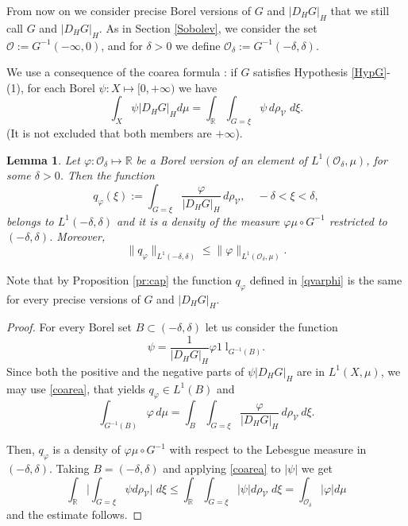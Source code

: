 \documentclass[reqno,twoside,12pt]{amsart}
\newtheorem{Lemma}[Theorem]{Lemma}
\begin{document}
From now on we consider  precise Borel versions of $G$ and $|D_HG|_H$ that we still call $G$ and $|D_HG|_H$. As in  Section \ref{Sobolev}, we consider the set ${\mathcal O}:= G^{-1}(-\infty, 0)$, and for $\delta >0$ we define
${\mathcal O}_{\delta} := G^{-1}(-\delta, \delta)$.   

We use a consequence of the coarea formula \cite[Thm. 5.7]{Feyel}: if $G$ satisfies Hypothesis \ref{HypG}-(1), for each Borel $\psi:X\mapsto [0, +\infty)$ we have
\begin{equation}
\label{coarea}
\int_X \psi |D_HG |_Hd\mu = \int_{\mathbb R} \int_{G =\xi} \psi \,d\rho_{{\mathcal V}} \;d\xi .
\end{equation}
(It is not excluded that both members are $+\infty$). 
 

\begin{Lemma}
\label{Cor:coarea}
Let $\varphi :{\mathcal O}_{\delta}\mapsto {\mathbb R}$ be a Borel version of an element of  $L^1({\mathcal O}_{\delta}, \mu)$, for some $\delta >0$. Then 
the function
\begin{equation}
\label{qvarphi}
q_{\varphi}(\xi):= \int_{G=\xi}\frac{\varphi}{|D_HG|_H}\,d\rho_{{\mathcal V}}  , \quad -\delta <\xi<\delta ,
\end{equation}
belongs to  $L^1(-\delta, \delta)$ and it is a density of the measure $\varphi \mu\circ G^{-1}$ restricted to  $(-\delta, \delta)$.   Moreover, 
\begin{equation}
\label{maggL1} \|q_{\varphi}\|_{L^{1}(-\delta, \delta)} \leq  \|\varphi\|_{ L^1({\mathcal O}_{\delta}, \mu)}.
\end{equation}
\end{Lemma}

Note that by Proposition \ref{pr:cap} the function $q_{\varphi}$ defined in \eqref{qvarphi} is the same for every precise versions of $G$ and  $|D_HG|_H$. 
\begin{proof} For every Borel set   $B\subset (-\delta, \delta)$ let us consider the function
$$\psi = \frac{ 1}{|D_HG|_H} \varphi  {1\!\!\!\;\mathrm{l}}_{G^{-1}(B)} .$$
Since  both the positive and the negative parts of  $\psi |D_HG|_H$ are in $L^1(X, \mu)$, we may use  \eqref{coarea}, that yields  $q_{\varphi}\in L^1(B)$ and 
$$\int_{G^{-1}(B)} \varphi \,d\mu = \int_B \int_{G=\xi} \frac{\varphi}{|D_HG|_H}\,d\rho_{{\mathcal V}}\,d\xi.$$
 
Then, $q_{\varphi}$ is a density of $\varphi \mu\circ G^{-1}$ with respect to the Lebesgue measure  in  $(-\delta, \delta)$. Taking   $B= (-\delta, \delta)$ and applying  \eqref{coarea} to $|\psi|$ we get 
$$ \int_{\mathbb R} \bigg| \int_{G=\xi} \psi d\rho_{{\mathcal V}} \bigg| \;d\xi \leq  \int_{\mathbb R} \int_{G=\xi} |\psi | d\rho_{{\mathcal V}}  \;d\xi 
= \int_{{\mathcal O}_{\delta}} |\varphi|  d\mu $$
and the estimate follows. 
\end{proof}
\end{document}

